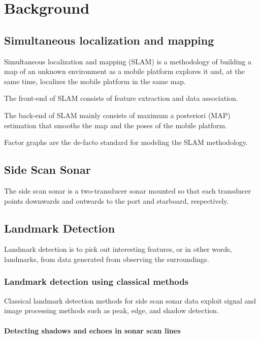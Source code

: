 \chapter{Background}

\section{Simultaneous localization and mapping}

Simultaneous localization and mapping (SLAM) is a methodology of building a map of an unknown environment as a mobile platform explores it and, at the same time, localizes the mobile platform in the same map. 

The front-end of SLAM consists of feature extraction and data association.

The back-end of SLAM mainly consists of maximum a posteriori (MAP) estimation that smooths the map and the poses of the mobile platform. 

Factor graphs are the de-facto standard for modeling the SLAM methodology. 

\section{Side Scan Sonar}

The side scan sonar is a two-transducer sonar mounted so that each transducer points downwards and outwards to the port and starboard, respectively.

\section{Landmark Detection}

Landmark detection is to pick out interesting features, or in other words, landmarks, from data generated from observing the surroundings.

\subsection{Landmark detection using classical methods}

Classical landmark detection methods for side scan sonar data exploit signal and image processing methods such as peak, edge, and shadow detection. 

\subsubsection{Detecting shadows and echoes in sonar scan lines}

